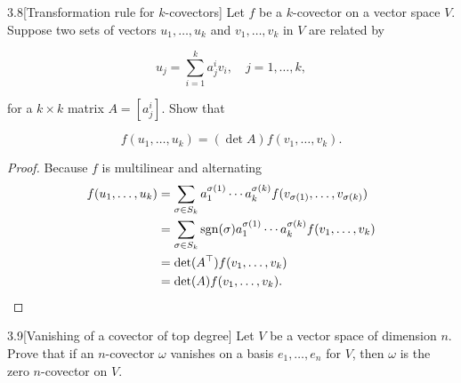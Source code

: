 \begin{problem}{3.8}[Transformation rule for \( k \)-covectors]
Let \( f \) be a \( k \)-covector on a vector space \( V \). Suppose two sets of vectors \( u_{1}, \ldots, u_{k} \) and \( v_{1}, \ldots, v_{k} \) in \( V \) are related by

\[
	u_{j} = \sum_{i=1}^{k} a_{j}^{i} v_{i}, \quad j = 1, \ldots, k,
\]

for a \( k \times k \) matrix \( A = [a_{j}^{i}] \). Show that

\[
	f(u_{1}, \ldots, u_{k}) = (\det A) f(v_{1}, \ldots, v_{k}).
\]
\end{problem}

\begin{proof}
	Because \( f \) is multilinear and alternating
	\begingroup
	\allowdisplaybreaks%
	\begin{align*}
		f(u_{1}, \ldots, u_{k}) & = \sum_{\sigma \in S_{k}} a^{\sigma(1)}_{1}\cdots a^{\sigma(k)}_{k} f(v_{\sigma(1)}, \ldots, v_{\sigma(k)})           \\
		                        & = \sum_{\sigma \in S_{k}} \operatorname{sgn}(\sigma)a^{\sigma(1)}_{1}\cdots a^{\sigma(k)}_{k} f(v_{1}, \ldots, v_{k}) \\
		                        & = \det(A^{\top}) f(v_{1}, \ldots, v_{k})                                                                              \\
		                        & = \det(A) f(v_{1}, \ldots, v_{k}). \qedhere
	\end{align*}
	\endgroup
\end{proof}

\begin{problem}{3.9}[Vanishing of a covector of top degree]\label{problem:3.9}
Let \( V \) be a vector space of dimension \( n \). Prove that if an \( n \)-covector \( \omega \) vanishes on a basis \( e_{1}, \ldots, e_{n} \) for \( V \), then \( \omega \) is the zero \( n \)-covector on \( V \).
\end{problem}

